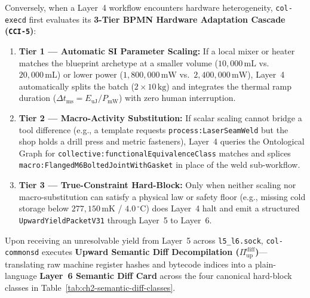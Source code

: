 Conversely, when a Layer~4 workflow encounters hardware heterogeneity, \texttt{col-execd} first evaluates its \textbf{3-Tier BPMN Hardware Adaptation Cascade (\texttt{CCI-5})}:
\begin{enumerate}
    \item \textbf{Tier 1 --- Automatic SI Parameter Scaling:} If a local mixer or heater matches the blueprint archetype at a smaller volume ($10{,}000\,\mathrm{mL}$ vs.\ $20{,}000\,\mathrm{mL}$) or lower power ($1{,}800{,}000\,\mathrm{mW}$ vs.\ $2{,}400{,}000\,\mathrm{mW}$), Layer~4 automatically splits the batch ($2 \times 10\,\mathrm{kg}$) and integrates the thermal ramp duration ($\Delta t_{\mathrm{ms}} = E_{\mathrm{uJ}} / P_{\mathrm{mW}}$) with zero human interruption.
    \item \textbf{Tier 2 --- Macro-Activity Substitution:} If scalar scaling cannot bridge a tool difference (e.g., a template requests \texttt{process:LaserSeamWeld} but the shop holds a drill press and metric fasteners), Layer~4 queries the Ontological Graph for \texttt{collective:functionalEquivalenceClass} matches and splices \texttt{macro:FlangedM6BoltedJointWithGasket} in place of the weld sub-workflow.
    \item \textbf{Tier 3 --- True-Constraint Hard-Block:} Only when neither scaling nor macro-substitution can satisfy a physical law or safety floor (e.g., missing cold storage below $277{,}150\,\mathrm{mK}$ / $4.0\,^\circ\mathrm{C}$) does Layer~4 halt and emit a structured \texttt{UpwardYieldPacketV31} through Layer~5 to Layer~6.
\end{enumerate}

Upon receiving an unresolvable yield from Layer~5 across \texttt{l5\_l6.sock}, \texttt{col-commonsd} executes \textbf{Upward Semantic Diff Decompilation ($\Pi_{\mathrm{up}}^{\mathrm{diff}}$)}---translating raw machine register hashes and bytecode indices into a plain-language \textbf{Layer~6 Semantic Diff Card} across the four canonical hard-block classes in Table~\ref{tab:ch2-semantic-diff-classes}.

